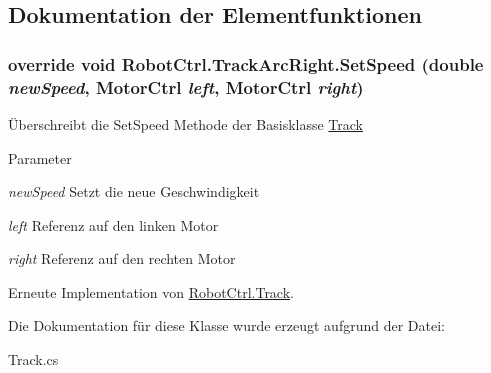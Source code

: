 \subsection{Dokumentation der Elementfunktionen}
\hypertarget{class_robot_ctrl_1_1_track_arc_right_a7b2db0d3709e4919da0645a6713a87bb}{
\subsubsection[{SetSpeed}]{\setlength{\rightskip}{0pt plus 5cm}override void RobotCtrl.TrackArcRight.SetSpeed (double {\em newSpeed}, \/  {\bf MotorCtrl} {\em left}, \/  {\bf MotorCtrl} {\em right})}}
\label{class_robot_ctrl_1_1_track_arc_right_a7b2db0d3709e4919da0645a6713a87bb}
\"{U}berschreibt die SetSpeed Methode der Basisklasse \hyperlink{class_robot_ctrl_1_1_track}{Track}


\begin{DoxyParams}{Parameter}
\item[{\em newSpeed}]Setzt die neue Geschwindigkeit \item[{\em left}]Referenz auf den linken Motor \item[{\em right}]Referenz auf den rechten Motor \end{DoxyParams}


Erneute Implementation von \hyperlink{class_robot_ctrl_1_1_track_a9abc3ccf4bf1d9db8d461f2cb4b4b0d3}{RobotCtrl.Track}.



Die Dokumentation für diese Klasse wurde erzeugt aufgrund der Datei:\begin{DoxyCompactItemize}
\item 
Track.cs\end{DoxyCompactItemize}
